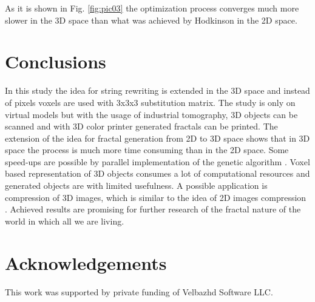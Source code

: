 \documentclass{llncs}
\begin{document}
As it is shown in Fig. \ref{fig:pic03} the optimization process converges much more slower in the 3D space than what was achieved by Hodkinson in the 2D space.

\section{Conclusions} \label{Conclusions}

In this study the idea for string rewriting is extended in the 3D space and instead of pixels voxels are used with 3x3x3 substitution matrix. The study is only on virtual models but with the usage of industrial tomography, 3D objects can be scanned and with 3D color printer generated fractals can be printed. The extension of the idea for fractal generation from 2D to 3D space shows that in 3D space the process is much more time consuming than in the 2D space. Some speed-ups are possible by parallel implementation of the genetic algorithm \cite{shonkwiler02}. Voxel based representation of 3D objects consumes a lot of computational resources and generated objects are with limited usefulness. A possible application is compression of 3D images, which is similar to the idea of 2D images compression \cite{vences01,albundi01}. Achieved results are promising for further research of the fractal nature of the world in which all we are living. 

\section*{Acknowledgements}
This work was supported by private funding of Velbazhd Software LLC.
\end{document}
